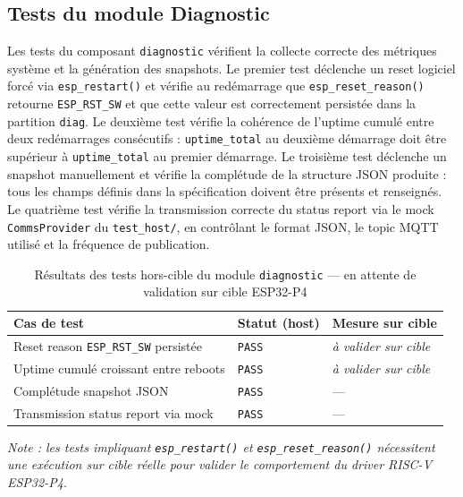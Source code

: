 \subsection{Tests du module Diagnostic}
\label{subsec:t_diag}

Les tests du composant \texttt{diagnostic} vérifient la collecte
correcte des métriques système et la génération des snapshots. Le
premier test déclenche un reset logiciel forcé via
\texttt{esp\_restart()} et vérifie au redémarrage que
\texttt{esp\_reset\_reason()} retourne \texttt{ESP\_RST\_SW} et que
cette valeur est correctement persistée dans la partition \texttt{diag}.
Le deuxième test vérifie la cohérence de l'uptime cumulé entre deux
redémarrages consécutifs : \texttt{uptime\_total} au deuxième démarrage
doit être supérieur à \texttt{uptime\_total} au premier démarrage.
Le troisième test déclenche un snapshot manuellement et vérifie la
complétude de la structure JSON produite : tous les champs définis
dans la spécification doivent être présents et renseignés. Le quatrième
test vérifie la transmission correcte du status report via le mock
\texttt{CommsProvider} du \texttt{test\_host/}, en contrôlant le
format JSON, le topic MQTT utilisé et la fréquence de publication.

\begin{table}[H]
\centering
\renewcommand{\arraystretch}{1.5}
\caption{Résultats des tests hors-cible du module \texttt{diagnostic} — en attente de validation sur cible ESP32-P4}
\label{tab:res_diag}
\small
\begin{tabular}{|p{5.5cm}|p{2.2cm}|p{3.8cm}|}
\hline
\rowcolor{gray!20}
\textbf{Cas de test} & \textbf{Statut (host)} & \textbf{Mesure sur cible} \\
\hline
Reset reason \texttt{ESP\_RST\_SW} persistée & \texttt{PASS} & \textit{à valider sur cible} \\
\hline
Uptime cumulé croissant entre reboots         & \texttt{PASS} & \textit{à valider sur cible} \\
\hline
Complétude snapshot JSON                      & \texttt{PASS} & — \\
\hline
Transmission status report via mock           & \texttt{PASS} & — \\
\hline
\end{tabular}
\end{table}

\noindent\textit{Note : les tests impliquant \texttt{esp\_restart()} et
\texttt{esp\_reset\_reason()} nécessitent une exécution sur cible réelle
pour valider le comportement du driver RISC-V ESP32-P4.}

